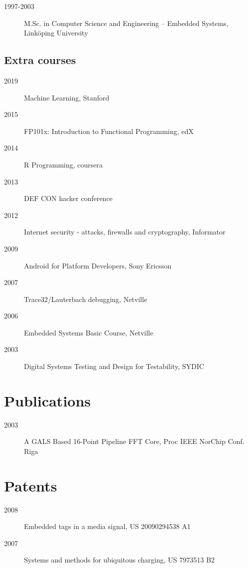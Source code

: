 \documentclass[ DIV=calc,%
                paper=a4,%
                fontsize=11pt,%
                twocolumn]{scrartcl}
\begin{document}
\begin{description}
    \item[1997-2003] M.Sc. in Computer Science and Engineering – Embedded Systems, Linköping University
\end{description}

\subsection*{Extra courses}

\begin{description}
    \item[2019] Machine Learning, Stanford
    \item[2015] FP101x: Introduction to Functional Programming, edX
    \item[2014] R Programming, coursera
    \item[2013] DEF CON hacker conference
    \item[2012] Internet security - attacks, firewalls and cryptography, Informator
    \item[2009] Android for Platform Developers, Sony Ericsson
    \item[2007] Trace32/Lauterbach debugging, Netville
    \item[2006] Embedded Systems Basic Course, Netville
    \item[2003] Digital Systems Testing and Design for Testability, SYDIC
\end{description}

\section*{Publications}

\begin{description}
    \item[2003] A GALS Based 16-Point Pipeline FFT Core, Proc IEEE NorChip Conf. Riga
\end{description}

\section*{Patents}

\begin{description}
    \item[2008] Embedded tags in a media signal, US 20090294538 A1
    \item[2007] Systems and methods for ubiquitous charging, US 7973513 B2
\end{description}
\end{document}
